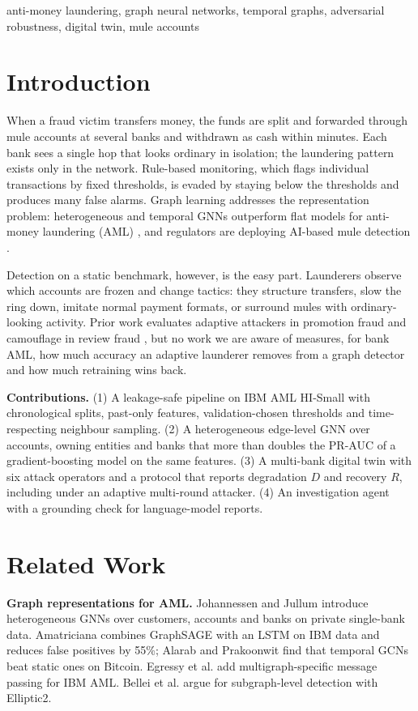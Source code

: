 \documentclass[conference]{IEEEtran}
\begin{document}
\begin{IEEEkeywords}
anti-money laundering, graph neural networks, temporal graphs, adversarial robustness, digital twin, mule accounts
\end{IEEEkeywords}

\section{Introduction}
When a fraud victim transfers money, the funds are split and forwarded through mule accounts at several banks and withdrawn as cash within minutes. Each bank sees a single hop that looks ordinary in isolation; the laundering pattern exists only in the network. Rule-based monitoring, which flags individual transactions by fixed thresholds, is evaded by staying below the thresholds and produces many false alarms. Graph learning addresses the representation problem: heterogeneous and temporal GNNs outperform flat models for anti-money laundering (AML) \cite{johannessen2025finding, digennaro2024amatriciana, alarab2023graph}, and regulators are deploying AI-based mule detection \cite{rbih2024mulehunter}.

Detection on a static benchmark, however, is the easy part. Launderers observe which accounts are frozen and change tactics: they structure transfers, slow the ring down, imitate normal payment formats, or surround mules with ordinary-looking activity. Prior work evaluates adaptive attackers in promotion fraud \cite{prasetya2025multi} and camouflage in review fraud \cite{dou2020enhancing}, but no work we are aware of measures, for bank AML, how much accuracy an adaptive launderer removes from a graph detector and how much retraining wins back.

\textbf{Contributions.} (1) A leakage-safe pipeline on IBM AML HI-Small \cite{altman2023realistic} with chronological splits, past-only features, validation-chosen thresholds and time-respecting neighbour sampling. (2) A heterogeneous edge-level GNN over accounts, owning entities and banks that more than doubles the PR-AUC of a gradient-boosting model on the same features. (3) A multi-bank digital twin with six attack operators and a protocol that reports degradation $D$ and recovery $R$, including under an adaptive multi-round attacker. (4) An investigation agent with a grounding check for language-model reports.

\section{Related Work}
\textbf{Graph representations for AML.} Johannessen and Jullum \cite{johannessen2025finding} introduce heterogeneous GNNs over customers, accounts and banks on private single-bank data. Amatriciana \cite{digennaro2024amatriciana} combines GraphSAGE with an LSTM on IBM data and reduces false positives by 55\%; Alarab and Prakoonwit \cite{alarab2023graph} find that temporal GCNs beat static ones on Bitcoin. Egressy et al. \cite{egressy2024provably} add multigraph-specific message passing for IBM AML. Bellei et al. \cite{bellei2024shape} argue for subgraph-level detection with Elliptic2.
\end{document}
